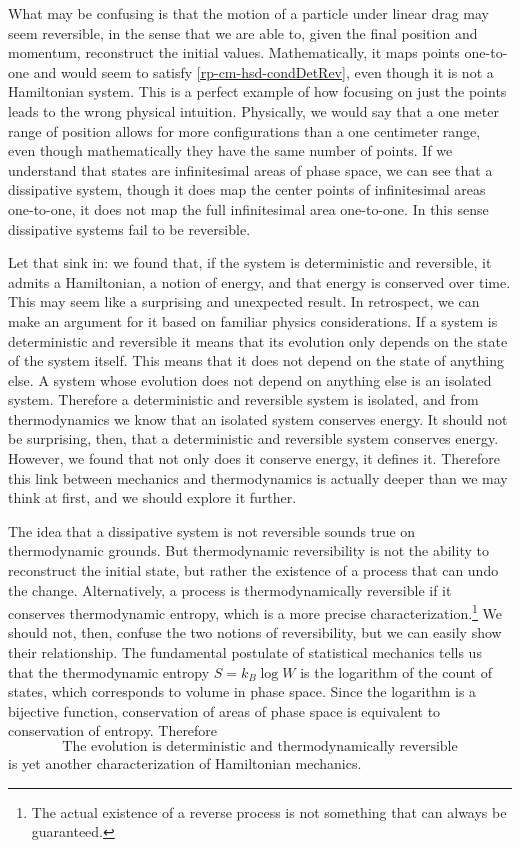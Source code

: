What may be confusing is that the motion of a particle under linear drag may seem reversible, in the sense that we are able to, given the final position and momentum, reconstruct the initial values. Mathematically, it maps points one-to-one and would seem to satisfy \ref{rp-cm-hsd-condDetRev}, even though it is not a Hamiltonian system. This is a perfect example of how focusing on just the points leads to the wrong physical intuition. Physically, we would say that a one meter range of position allows for more configurations than a one centimeter range, even though mathematically they have the same number of points. If we understand that states are infinitesimal areas of phase space, we can see that a dissipative system, though it does map the center points of infinitesimal areas one-to-one, it does not map the full infinitesimal area one-to-one. In this sense dissipative systems fail to be reversible.

Let that sink in: we found that, if the system is deterministic and reversible, it admits a Hamiltonian, a notion of energy, and that energy is conserved over time. This may seem like a surprising and unexpected result. In retrospect, we can make an argument for it based on familiar physics considerations. If a system is deterministic and reversible it means that its evolution only depends on the state of the system itself. This means that it does not depend on the state of anything else. A system whose evolution does not depend on anything else is an isolated system. Therefore a deterministic and reversible system is isolated, and from thermodynamics we know that an isolated system conserves energy. It should not be surprising, then, that a deterministic and reversible system conserves energy. However, we found that not only does it conserve energy, it defines it. Therefore this link between mechanics and thermodynamics is actually deeper than we may think at first, and we should explore it further.

The idea that a dissipative system is not reversible sounds true on thermodynamic grounds. But thermodynamic reversibility is not the ability to reconstruct the initial state, but rather the existence of a process that can undo the change. Alternatively, a process is  thermodynamically reversible if it conserves thermodynamic entropy, which is a more precise characterization.\footnote{The actual existence of a reverse process is not something that can always be guaranteed.} We should not, then, confuse the two notions of reversibility, but we can easily show their relationship. The fundamental postulate of statistical mechanics tells us that the thermodynamic entropy $S = k_B \log W$ is the logarithm of the count of states, which corresponds to volume in phase space. Since the logarithm is a bijective function, conservation of areas of phase space is equivalent to conservation of entropy. Therefore
\begin{equation}\label{rp-cm-hsd-condThermoRev}
	\tag{HM-10}
	\text{The evolution is deterministic and thermodynamically reversible}	
\end{equation}
is yet another characterization of Hamiltonian mechanics.

